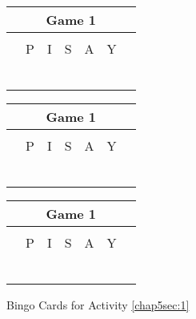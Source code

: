 \begin{figure}[!h]
\centering
\caption{Bingo Cards for Activity \eqref{chap5sec:1}}
\begin{tabular}{|c|c|c|c|c|c|c|}
\hline
\multicolumn{7}{|c|}{Game 1}\\
\hline
\multicolumn{7}{|c|}{}\\
\cline{2-6}
\hphantom{.} & P & I & S & A & Y & \hphantom{.}\\
\cline{2-6}
 & & &\cellcolor{\bingo} & & & \\ \cline{2-6}
 & & &\cellcolor{\bingo} & & & \\ \cline{2-6}
 & & &\cellcolor{\bingo} & & & \\ \cline{2-6}
 & & &\cellcolor{\bingo} & & & \\ \cline{2-6}
 & & &\cellcolor{\bingo} & & & \\ \cline{2-6}
\multicolumn{7}{|c|}{}\\
\hline
\end{tabular}
\hfil 
\begin{tabular}{|c|c|c|c|c|c|c|}
\hline
\multicolumn{7}{|c|}{Game 1}\\
\hline
\multicolumn{7}{|c|}{}\\
\cline{2-6}
\hphantom{.} & P & I & S & A & Y & \hphantom{.}\\
\cline{2-6}
 &\cellcolor{\bingo} & & & & \cellcolor{\bingo} & \\ \cline{2-6}
 & & & & & & \\ \cline{2-6}
 & & &\cellcolor{\bingo} & & & \\ \cline{2-6}
 & & & & & & \\ \cline{2-6}
 & \cellcolor{\bingo} & & & & \cellcolor{\bingo} & \\ \cline{2-6}
\multicolumn{7}{|c|}{}\\
\hline
\end{tabular}
\hfil 
\begin{tabular}{|c|c|c|c|c|c|c|}
\hline
\multicolumn{7}{|c|}{Game 1}\\
\hline
\multicolumn{7}{|c|}{}\\
\cline{2-6}
\hphantom{.} & P & I & S & A & Y & \hphantom{.}\\
\cline{2-6}
 &\cellcolor{\bingo} & & & & \cellcolor{\bingo} & \\ \cline{2-6}
 & & \cellcolor{\bingo} & & \cellcolor{\bingo} & & \\ \cline{2-6}
 & & &\cellcolor{\bingo} & & & \\ \cline{2-6}
 & & \cellcolor{\bingo} & & \cellcolor{\bingo} & & \\ \cline{2-6}
 & \cellcolor{\bingo} & & & & \cellcolor{\bingo} & \\ \cline{2-6}
\multicolumn{7}{|c|}{}\\
\hline
\end{tabular}
\label{chap5fig:1}
\end{figure}

